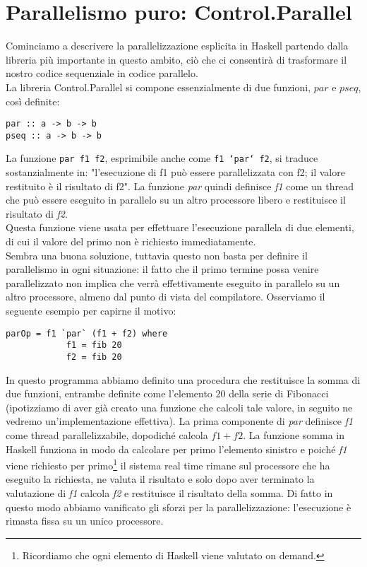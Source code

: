 \section{Parallelismo puro: Control.Parallel}
Cominciamo a descrivere la parallelizzazione esplicita in Haskell partendo dalla libreria più importante in questo ambito, ciò che ci consentirà di trasformare il nostro codice sequenziale in codice parallelo.\\
La libreria Control.Parallel si compone essenzialmente di due funzioni, $par$ e $pseq$, così definite:
\begin{verbatim}
par :: a -> b -> b
pseq :: a -> b -> b
\end{verbatim}
La funzione \texttt{par f1 f2}, esprimibile anche come \texttt{f1 `par` f2}, si traduce sostanzialmente in: "l'esecuzione di f1 può essere parallelizzata con f2; il valore restituito è il risultato di f2". La funzione \textit{par} quindi definisce \textit{f1} come un thread che può essere eseguito in parallelo su un altro processore libero e restituisce il risultato di \textit{f2}.\\
Questa funzione viene usata per effettuare l'esecuzione parallela di due elementi, di cui il valore del primo non è richiesto immediatamente.\\
Sembra una buona soluzione, tuttavia questo non basta per definire il parallelismo in ogni situazione: il fatto che il primo termine possa venire parallelizzato non implica che verrà effettivamente eseguito in parallelo su un altro processore, almeno dal punto di vista del compilatore. Osserviamo il seguente esempio per capirne il motivo:
\begin{verbatim}
parOp = f1 `par` (f1 + f2) where
            f1 = fib 20
            f2 = fib 20
\end{verbatim}
In questo programma abbiamo definito una procedura che restituisce la somma di due funzioni, entrambe definite come l'elemento 20 della serie di Fibonacci (ipotizziamo di aver già creato una funzione che calcoli tale valore, in seguito ne vedremo un'implementazione effettiva). La prima componente di \textit{par} definisce \textit{f1} come thread parallelizzabile, dopodiché calcola $f1 + f2$. La funzione somma in Haskell funziona in modo da calcolare per primo l'elemento sinistro e poiché \textit{f1} viene richiesto per primo\footnote{Ricordiamo che ogni elemento di Haskell viene valutato on demand.} il sistema real time rimane sul processore che ha eseguito la richiesta, ne valuta il risultato e solo dopo aver terminato la valutazione di \textit{f1} calcola \textit{f2} e restituisce il risultato della somma. Di fatto in questo modo abbiamo vanificato gli sforzi per la parallelizzazione: l'esecuzione è rimasta fissa su un unico processore.\\
